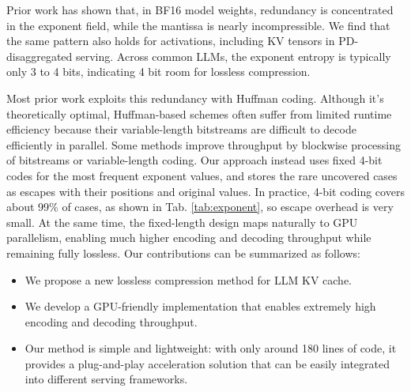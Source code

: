 Prior work has shown that, in BF16 model weights, redundancy is concentrated in the exponent field, while the mantissa is nearly incompressible\cite{dfloat11}. We find that the same pattern also holds for activations, including KV tensors in PD-disaggregated serving. Across common LLMs, the exponent entropy is typically only 3 to 4 bits, indicating 4 bit room for lossless compression.

Most prior work exploits this redundancy with Huffman coding\cite{yubeaton2025huffllm,dfloat11,agrawal202sshuffman}. Although it's theoretically optimal, Huffman-based schemes often suffer from limited runtime efficiency because their variable-length bitstreams are difficult to decode efficiently in parallel. Some methods improve throughput by blockwise processing of bitstreams\cite{yubeaton2025huffllm} or variable-length coding\cite{agrawal2026quadlength}. Our approach instead uses fixed 4-bit codes for the most frequent exponent values, and stores the rare uncovered cases as escapes with their positions and original values. In practice, 4-bit coding covers about 99\% of cases, as shown in Tab. \ref{tab:exponent}, so escape overhead is very small. At the same time, the fixed-length design maps naturally to GPU parallelism, enabling much higher encoding and decoding throughput while remaining fully lossless. Our contributions can be summarized as follows:

\begin{itemize}
    \item We propose a new lossless compression method for LLM KV cache.
    \item We develop a GPU-friendly implementation that enables extremely high encoding and decoding throughput.
    \item Our method is simple and lightweight: with only around 180 lines of code, it provides a plug-and-play acceleration solution that can be easily integrated into different serving frameworks.
\end{itemize}




